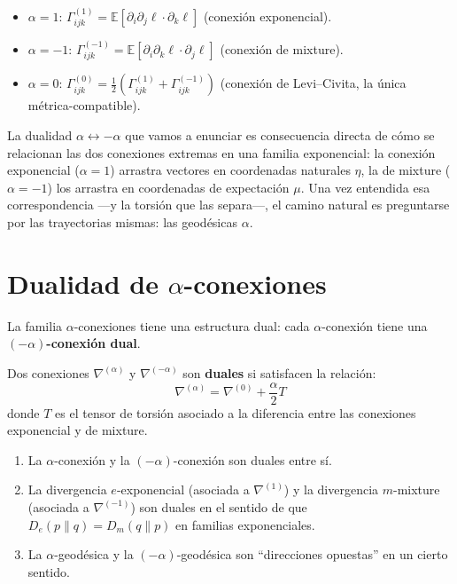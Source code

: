 \begin{proposition}
	\begin{itemize}
		\item $\alpha = 1$: $\Gamma^{(1)}_{ijk} = \mathbb{E}[\partial_i \partial_j \ell \cdot \partial_k \ell]$ (conexión exponencial).
		\item $\alpha = -1$: $\Gamma^{(-1)}_{ijk} = \mathbb{E}[\partial_i \partial_k \ell \cdot \partial_j \ell]$ (conexión de mixture).
		\item $\alpha = 0$: $\Gamma^{(0)}_{ijk} = \frac{1}{2}(\Gamma^{(1)}_{ijk} + \Gamma^{(-1)}_{ijk})$ (conexión de Levi--Civita, la única métrica-compatible).
	\end{itemize}
\end{proposition}

\bigskip
\noindent
La dualidad $\alpha \leftrightarrow -\alpha$ que vamos a enunciar es consecuencia directa de cómo se relacionan las dos conexiones extremas en una familia exponencial: la conexión exponencial ($\alpha = 1$) arrastra vectores en coordenadas naturales $\eta$, la de mixture ($\alpha = -1$) los arrastra en coordenadas de expectación $\mu$. Una vez entendida esa correspondencia ---y la torsión que las separa---, el camino natural es preguntarse por las trayectorias mismas: las geodésicas $\alpha$.

\section[Dualidad de alpha-conexiones]{Dualidad de $\alpha$-conexiones}

La familia $\alpha$-conexiones tiene una estructura dual: cada $\alpha$-conexión tiene una \textbf{$(-\alpha)$-conexión dual}.

\begin{definition}[Dualidad]
	Dos conexiones $\nabla^{(\alpha)}$ y $\nabla^{(-\alpha)}$ son \textbf{duales} si satisfacen la relación:
	\[
	\nabla^{(\alpha)} = \nabla^{(0)} + \frac{\alpha}{2} T
	\]
	donde $T$ es el tensor de torsión asociado a la diferencia entre las conexiones exponencial y de mixture.
\end{definition}

\begin{theorem}
	\begin{enumerate}
		\item La $\alpha$-conexión y la $(-\alpha)$-conexión son duales entre sí.
		\item La divergencia $e$-exponencial (asociada a $\nabla^{(1)}$) y la divergencia $m$-mixture (asociada a $\nabla^{(-1)}$) son duales en el sentido de que $D_e(p \| q) = D_m(q \| p)$ en familias exponenciales.
		\item La $\alpha$-geodésica y la $(-\alpha)$-geodésica son ``direcciones opuestas'' en un cierto sentido.
	\end{enumerate}
\end{theorem}

